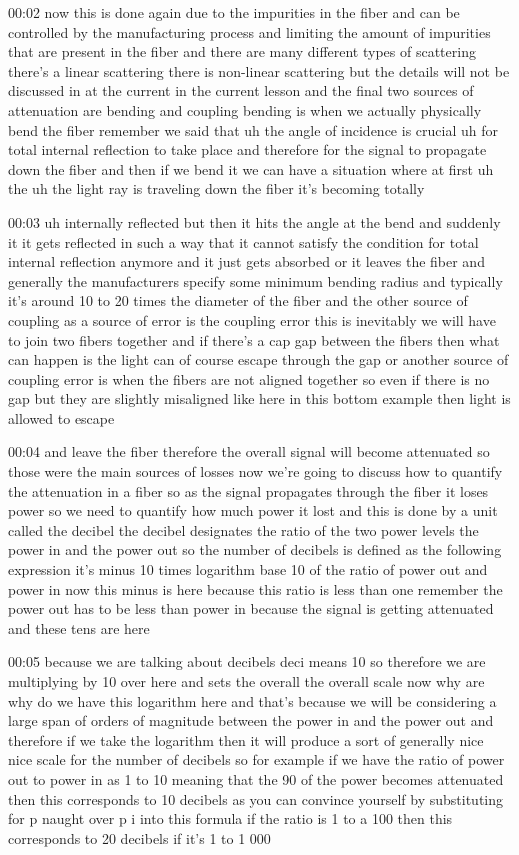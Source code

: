 00:02
now this is done again due to the impurities
in the fiber and can be controlled by the manufacturing process
and limiting the amount of impurities that are present in the fiber
and there are many different types of scattering there's a linear scattering
there is non-linear scattering but the details will not be discussed
in at the current in the current lesson and the final two sources of attenuation
are bending and coupling bending is when we actually
physically bend the fiber remember we said that uh
the angle of incidence is crucial uh for total internal reflection to take place
and therefore for the signal to propagate down the fiber
and then if we bend it we can have a situation where at first uh the
uh the light ray is traveling down the fiber it's becoming totally

00:03
uh internally reflected but then it hits the angle at the bend
and suddenly it it gets reflected in such a way that it
cannot satisfy the condition for total internal reflection anymore
and it just gets absorbed or it leaves the fiber
and generally the manufacturers specify some minimum bending radius
and typically it's around 10 to 20 times the diameter of the fiber
and the other source of coupling as a source of error
is the coupling error this is inevitably we will have to join two
fibers together and if there's a cap gap between the fibers
then what can happen is the light can of course escape through the gap
or another source of coupling error is when the fibers are not aligned together
so even if there is no gap but they are slightly misaligned like
here in this bottom example then light is allowed to escape

00:04
and leave the fiber therefore the overall signal will become attenuated so
those were the main sources of losses now we're going to discuss how to quantify
the attenuation in a fiber so as the signal propagates through the
fiber it loses power so we need to quantify how much power it lost
and this is done by a unit called the decibel
the decibel designates the ratio of the two power levels
the power in and the power out so the number of decibels is defined as
the following expression it's minus 10 times logarithm base 10 of the ratio
of power out and power in now this minus is here because this ratio
is less than one remember the power out has to be less than power in
because the signal is getting attenuated and these tens are here

00:05
because we are talking about decibels deci means 10 so therefore
we are multiplying by 10 over here and sets the overall
the overall scale now why are why do we have
this logarithm here and that's because we will be considering a large span of
orders of magnitude between the power in and the power out and
therefore if we take the logarithm then it will produce a sort of generally
nice nice scale for the number of decibels
so for example if we have the ratio of power out to power in
as 1 to 10 meaning that the 90 of the power becomes attenuated then
this corresponds to 10 decibels as you can convince yourself by
substituting for p naught over p i into this formula if the ratio is 1 to a 100
then this corresponds to 20 decibels if it's 1 to 1 000

